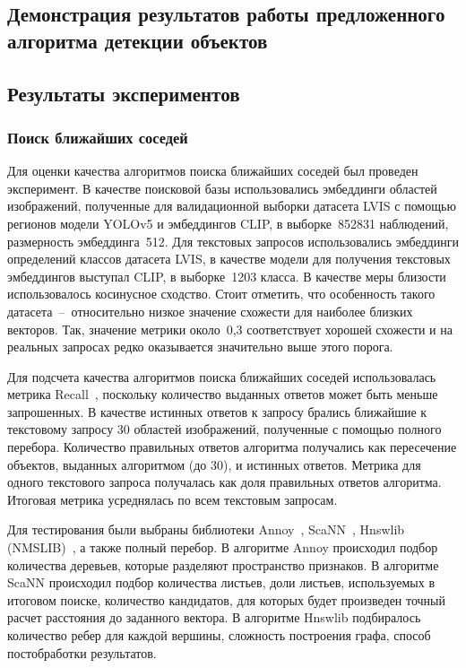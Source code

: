\documentclass[a4paper,14pt]{article}
\begin{document}
    \subsection{Демонстрация результатов работы предложенного алгоритма детекции объектов}


    \subsection{Результаты экспериментов}

    \subsubsection{Поиск ближайших соседей}

    Для оценки качества алгоритмов поиска ближайших соседей был проведен эксперимент.
    В качестве поисковой базы использовались эмбеддинги областей изображений, полученные для валидационной выборки датасета LVIS с помощью регионов модели YOLOv5 и эмбеддингов CLIP, в выборке~852831 наблюдений, размерность эмбеддинга~512.
    Для текстовых запросов использовались эмбеддинги определений классов датасета LVIS, в качестве модели для получения текстовых эмбеддингов выступал CLIP, в выборке~1203 класса.
    В качестве меры близости использовалось косинусное сходство.
    Стоит отметить, что особенность такого датасета~--~относительно низкое значение схожести для наиболее близких векторов.
    Так, значение метрики около~0,3 соответствует хорошей схожести и на реальных запросах редко оказывается значительно выше этого порога.

    Для подсчета качества алгоритмов поиска ближайших соседей использовалась метрика Recall~\cite{aumuller2020ann}, поскольку количество выданных ответов может быть меньше запрошенных.
    В качестве истинных ответов к запросу брались ближайшие к текстовому запросу 30 областей изображений, полученные с помощью полного перебора.
    Количество правильных ответов алгоритма получались как пересечение объектов, выданных алгоритмом (до 30), и истинных ответов.
    Метрика для одного текстового запроса получалась как доля правильных ответов алгоритма.
    Итоговая метрика усреднялась по всем текстовым запросам.

    Для тестирования были выбраны библиотеки Annoy~\cite{annoy}, ScaNN~\cite{avq_2020}, Hnswlib (NMSLIB)~\cite{malkov2018efficient}, а также полный перебор.
    В алгоритме Annoy происходил подбор количества деревьев, которые разделяют пространство признаков.
    В алгоритме ScaNN происходил подбор количества листьев, доли листьев, используемых в итоговом поиске, количество кандидатов, для которых будет произведен точный расчет расстояния до заданного вектора.
    В алгоритме Hnswlib подбиралось количество ребер для каждой вершины, сложность построения графа, способ постобработки результатов.
\end{document}
